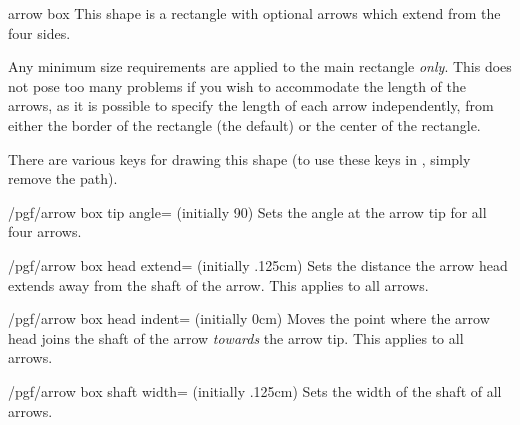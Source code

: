 \begin{shape}{arrow box}
This shape is a rectangle with optional arrows which extend from the
four sides.

\begin{codeexample}[]
\end{codeexample}

Any minimum size requirements are applied to the main rectangle
\emph{only}. This does not pose too many problems if you wish to
accommodate the length of the arrows, as it is possible to specify
the length of each arrow independently, from either the border of the
rectangle (the default) or the center of the rectangle.

\begin{codeexample}[]
\end{codeexample}

There are various \pgfname{} keys for drawing this shape (to use these
keys in \tikzname, simply remove the  path).

\begin{key}{/pgf/arrow box tip angle= (initially 90)}
  Sets the angle at the arrow tip for all four arrows.
\end{key}

\begin{key}{/pgf/arrow box head extend= (initially .125cm)}
  Sets the distance the arrow head extends away from the shaft
  of the arrow. This applies to all arrows.
\end{key}

\begin{key}{/pgf/arrow box head indent= (initially 0cm)}
  Moves the point where the arrow head joins the shaft of the arrow
  \emph{towards} the arrow tip. This applies to all arrows.
\end{key}

\begin{key}{/pgf/arrow box shaft width= (initially .125cm)}
  Sets the width of the shaft of all arrows.
\end{key}


\end{shape}
